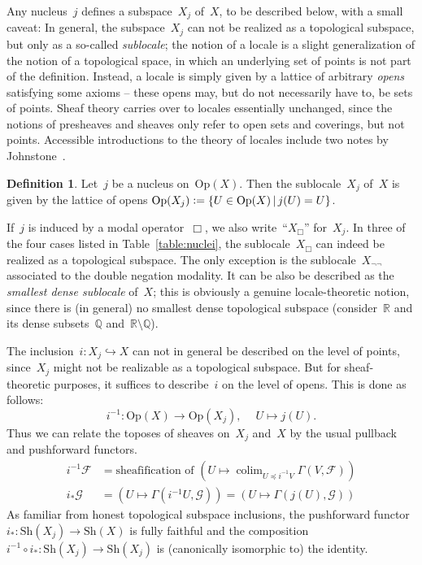 \documentclass[10pt]{amsart}
\theoremstyle{definition}
\newtheorem{defn}{Definition}[section]
\theoremstyle{plain}
\theoremstyle{remark}
\newcommand{\F}{\mathcal{F}}
\renewcommand{\G}{\mathcal{G}}
\newcommand{\RR}{\mathbb{R}}
\newcommand{\QQ}{\mathbb{Q}}
\newcommand{\Sh}{\mathrm{Sh}}
\DeclareMathOperator{\colim}{colim}
\newcommand{\Open}{\mathrm{Op}}
\newcommand{\?}{\,{:}\,}
\renewcommand{\_}{\mathpunct{.}\,}
\newcommand{\lra}{\longrightarrow}
\newcommand{\defeq}{\vcentcolon=}
\begin{document}
Any nucleus~$j$ defines a subspace~$X_j$ of~$X$, to be described below, with a small caveat: In
general, the subspace~$X_j$ can not be realized as a topological subspace, but
only as a so-called \emph{sublocale}; the notion of a locale is a slight
generalization of the notion of a topological space, in which an underlying set
of points is not part of the definition. Instead, a locale is simply given by a
lattice of arbitrary \emph{opens} satisfying some axioms -- these opens may, but do not necessarily have to,
be sets of points. Sheaf theory carries over to locales essentially unchanged,
since the notions of presheaves and sheaves only refer to open sets and coverings,
but not points.
Accessible introductions to the theory of locales include two notes by
Johnstone~\cite{johnstone:art,johnstone:point}.

\begin{defn}\label{defn:subspace-by-nucleus}Let~$j$ be a nucleus on~$\Open(X)$.
Then the sublocale~$X_j$ of~$X$ is given by the lattice of opens
$\Open(X_j) \defeq \{ U \in \Open(X) \,|\, j(U) = U \}$.
\end{defn}
If~$j$ is induced by a modal operator~$\Box$, we also write~``$X_\Box$''
for~$X_j$. In three of the four cases listed in Table~\ref{table:nuclei}, the
sublocale~$X_\Box$ can indeed be realized as a topological subspace. The only
exception is the sublocale~$X_{\neg\neg}$ associated to the double negation
modality. It can be also be described as the \emph{smallest dense sublocale}
of~$X$; this is obviously a genuine locale-theoretic notion, since there
is (in general) no smallest dense topological subspace
(consider~$\RR$ and its dense subsets~$\QQ$ and~$\RR \setminus \QQ$).

The inclusion~$i : X_j \hookrightarrow X$ can not in general be described on the
level of points, since~$X_j$ might not be realizable as a topological subspace.
But for sheaf-theoretic purposes, it suffices to describe~$i$ on the level of
opens. This is done as follows:
\[ i^{-1} : \Open(X) \lra \Open(X_j),\ \quad U \longmapsto j(U). \]
Thus we can relate the toposes of sheaves on~$X_j$ and~$X$ by the usual
pullback and pushforward functors.
\begin{align*}
  i^{-1} \F &= \text{sheafification of $(U \mapsto \colim_{U \preceq i^{-1}V} \Gamma(V,\F))$} \\
  i_* \G &= (U \mapsto \Gamma(i^{-1}U, \G)) = (U \mapsto \Gamma(j(U), \G))
\end{align*}
As familiar from honest topological subspace inclusions, the pushforward
functor~$i_* : \Sh(X_j) \to \Sh(X)$ is fully faithful and the composition~$i^{-1}
\circ i_* : \Sh(X_j) \to \Sh(X_j)$ is (canonically isomorphic to) the identity.
\end{document}
